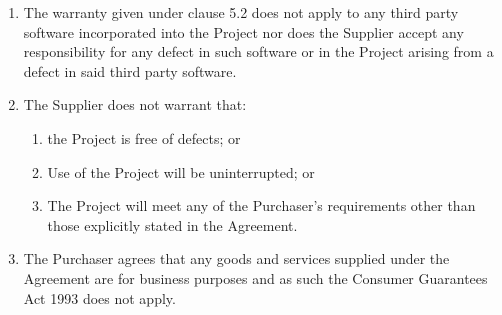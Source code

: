 \documentclass[nz-terms]{subfiles}
\begin{document}
\begin{enumerate}
\item The warranty given under clause 5.2 does not apply to any third party
software incorporated into the Project nor does the Supplier accept any
responsibility for any defect in such software or in the Project arising from
a defect in said third party software.
\item The Supplier does not warrant that:
    \begin{enumerate}
    \item the Project is free of defects; or
    \item Use of the Project will be uninterrupted; or
    \item The Project will meet any of the Purchaser's requirements other than
    those explicitly stated in the Agreement.
    \end{enumerate}
\item The Purchaser agrees that any goods and services supplied under the
Agreement are for business purposes and as such the Consumer Guarantees Act
1993 does not apply.
\end{enumerate}
\end{document}
